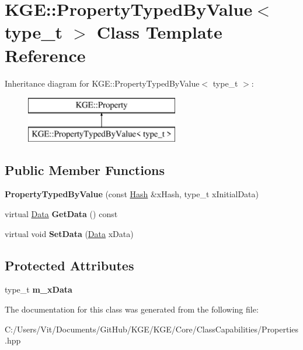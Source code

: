 \hypertarget{class_k_g_e_1_1_property_typed_by_value}{\section{K\-G\-E\-:\-:Property\-Typed\-By\-Value$<$ type\-\_\-t $>$ Class Template Reference}
\label{class_k_g_e_1_1_property_typed_by_value}
}
Inheritance diagram for K\-G\-E\-:\-:Property\-Typed\-By\-Value$<$ type\-\_\-t $>$\-:\begin{figure}[H]
\begin{center}
\leavevmode
\includegraphics[height=2.000000cm]{class_k_g_e_1_1_property_typed_by_value}
\end{center}
\end{figure}
\subsection*{Public Member Functions}
\begin{DoxyCompactItemize}
\item 
\hypertarget{class_k_g_e_1_1_property_typed_by_value_a0a024431a770645c7b6379f2bb943b80}{{\bfseries Property\-Typed\-By\-Value} (const \hyperlink{class_k_g_e_1_1_hash}{Hash} \&x\-Hash, type\-\_\-t x\-Initial\-Data)}\label{class_k_g_e_1_1_property_typed_by_value_a0a024431a770645c7b6379f2bb943b80}

\item 
\hypertarget{class_k_g_e_1_1_property_typed_by_value_af2fcefa3196c25cb747a0fbf66fceab1}{virtual \hyperlink{class_k_g_e_1_1_data}{Data} {\bfseries Get\-Data} () const }\label{class_k_g_e_1_1_property_typed_by_value_af2fcefa3196c25cb747a0fbf66fceab1}

\item 
\hypertarget{class_k_g_e_1_1_property_typed_by_value_a08d0237f52822663b9252818967fca77}{virtual void {\bfseries Set\-Data} (\hyperlink{class_k_g_e_1_1_data}{Data} x\-Data)}\label{class_k_g_e_1_1_property_typed_by_value_a08d0237f52822663b9252818967fca77}

\end{DoxyCompactItemize}
\subsection*{Protected Attributes}
\begin{DoxyCompactItemize}
\item 
\hypertarget{class_k_g_e_1_1_property_typed_by_value_a179924a3f3b1acf9c984f05ded2791bb}{type\-\_\-t {\bfseries m\-\_\-x\-Data}}\label{class_k_g_e_1_1_property_typed_by_value_a179924a3f3b1acf9c984f05ded2791bb}

\end{DoxyCompactItemize}


The documentation for this class was generated from the following file\-:\begin{DoxyCompactItemize}
\item 
C\-:/\-Users/\-Vit/\-Documents/\-Git\-Hub/\-K\-G\-E/\-K\-G\-E/\-Core/\-Class\-Capabilities/Properties.\-hpp\end{DoxyCompactItemize}
